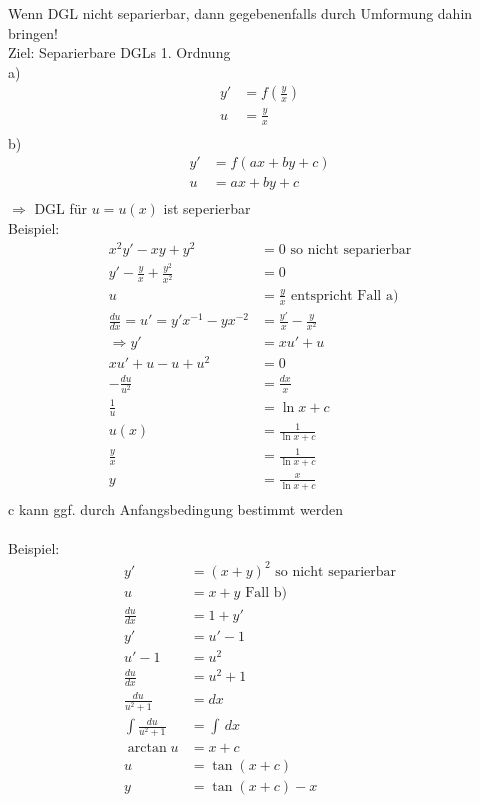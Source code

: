 \documentclass{article}
\begin{document}
Wenn DGL nicht separierbar, dann gegebenenfalls durch Umformung dahin bringen!\\
Ziel: Separierbare DGLs 1. Ordnung\\
a)
\begin{align*}
    y'&=f(\frac{y}{x})\\
    u &= \frac{y}{x}\\
\end{align*}
b) \begin{align*}
    y' &= f(ax+by+c)\\
    u &= ax+by+c\\
\end{align*}
$\Rightarrow$ DGL für $u = u(x)$ ist seperierbar\\
Beispiel:
\begin{align*}
    x^2y' -xy+y^2 &= 0 \text{ so nicht separierbar}\\
    y' - \frac{y}{x}+\frac{y^2}{x^2} &= 0\\
    u &= \frac{y}{x} \text{ entspricht Fall a)}\\
    \frac{du}{dx} = u'=y'x^{-1}-yx^{-2} &=\frac{y'}{x}-\frac{y}{x^2}\\
    \Rightarrow y' &= xu'+u\\
    xu'+u-u+u^2 &= 0\\
    -\frac{du}{u^2} &= \frac{dx}{x}\\
    \frac{1}{u} &= \ln x + c\\
    u(x) &= \frac{1}{\ln x + c}\\
    \frac{y}{x} &= \frac{1}{\ln x + c}\\
    y &= \frac{x}{\ln x + c}\\
\end{align*}
c kann ggf. durch Anfangsbedingung bestimmt werden\\\\
Beispiel:
\begin{align*}
    y' &= \left(x+y\right)^2 \text{ so nicht separierbar}\\
    u &= x+y \text{ Fall b)}\\
    \frac{du}{dx} &= 1+y'\\
    y' &= u' - 1\\
    u'-1 &= u^2\\
    \frac{du}{dx} &= u^2 +1\\
    \frac{du}{u^2+1} &= dx\\
    \int \frac{du}{u^2 + 1} &= \int \,dx\\
    \arctan u &= x+c\\
    u &= \tan(x+c)\\
    y &= \tan(x+c)-x
\end{align*}
\end{document}
